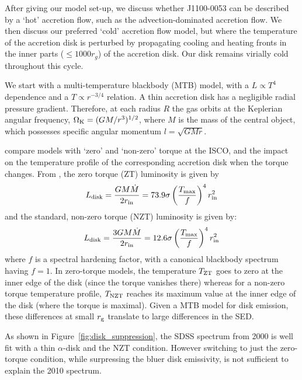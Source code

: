 \documentclass[a4paper,fleqn,usenatbib]{mnras}
\begin{document}
After giving our model set-up, we discuss whether J1100-0053 can be
described by a `hot' accretion flow, such as the advection-dominated
accretion flow. We then discuss our preferred `cold' accretion flow
model, but where the temperature of the accretion disk is perturbed by
propagating cooling and heating fronts in the inner parts ($\leq 1000
r_{g}$) of the accretion disk. Our disk remains virially cold
throughout this cycle.
 
We start with a multi-temperature blackbody (MTB) model, with a $L
\propto T^4$ dependence and a $T \propto r^{-3/4}$ relation. A thin
accretion disk has a negligible radial pressure gradient. Therefore,
at each radius $R$ the gas orbits at the Keplerian angular frequency,
$\Omega_{\rm K} = (GM/r^{3})^{1/2}$, where $M$ is the mass of the
central object, which possesses specific angular momentum $l=
\sqrt{GMr}$.

\citet{Zimmerman2005} compare models with `zero' and `non-zero' torque
at the ISCO, and the impact on the temperature profile of the
corresponding accretion disk when the torque changes.  From
\citet{Zimmerman2005}, the zero torque (ZT) luminosity is given by
\begin{equation}
L_{\rm disk}   =  \frac{G M \dot{M}}  {2 r_{\rm in}}    = 73.9 \sigma\left ( \frac{T_{\rm max}}{f}  \right )^{4}  r^{2}_{\rm in} 
\end{equation}
and the standard, non-zero torque (NZT) luminosity is given by:
\begin{equation}
L_{\rm disk} = \frac{3 G M \dot{M}}  {2 r_{\rm in}}    = 12.6 \sigma\left ( \frac{T_{\rm max}}{f}  \right )^{4}  r^{2}_{\rm in} 
\end{equation} 
where $f$ is a spectral hardening factor, with a canonical blackbody
spectrum having $f=1$. In zero-torque models, the temperature $T_{\rm
ZT}$ goes to zero at the inner edge of the disk (since the torque
vanishes there) whereas for a non-zero torque temperature profile,
$T_{\rm NZT}$ reaches its maximum value at the inner edge of the disk
(where the torque is maximal). Given a MTB model for disk emission,
these differences at small $r_{\rm g}$ translate to large differences
in the SED.

As shown in Figure~\ref{fig:disk_suppression}, the SDSS spectrum from
2000 is well fit with a thin \citet{SS73} $\alpha$-disk and the NZT
condition.  However switching to just the zero-torque condition, while
surpressing the bluer disk emissivity, is not sufficient to explain
the 2010 spectrum.
\end{document}
